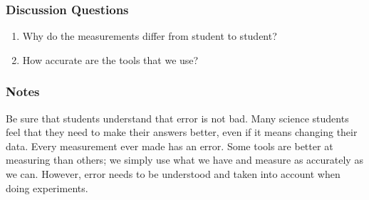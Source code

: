 \subsubsection*{Discussion Questions}
\begin{enumerate}
\item{Why do the measurements differ from student to student?}
\item{How accurate are the tools that we use?}
\end{enumerate}

\subsubsection*{Notes}
Be sure that students understand that error is not bad. Many science students feel that they need to make their answers better, even if it means changing their data. Every measurement ever made has an error. Some tools are better at measuring than others; we simply use what we have and measure as accurately as we can. However, error needs to be understood and taken into account when doing experiments.
